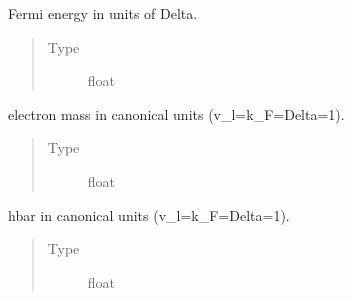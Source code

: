 \documentclass[letterpaper,10pt,english]{sphinxmanual}
\begin{document}
\begin{fulllineitems}
\begin{fulllineitems}
\end{fulllineitems}


\begin{fulllineitems}
\label{\detokenize{code_structure:scdc.material.Material.z}}
Fermi energy in units of Delta.
\begin{quote}\begin{description}
\item[{Type}] \leavevmode
float

\end{description}\end{quote}

\end{fulllineitems}


\begin{fulllineitems}
\label{\detokenize{code_structure:scdc.material.Material.m_e}}
electron mass in canonical units (v\_l=k\_F=Delta=1).
\begin{quote}\begin{description}
\item[{Type}] \leavevmode
float

\end{description}\end{quote}

\end{fulllineitems}


\begin{fulllineitems}
\label{\detokenize{code_structure:scdc.material.Material.hbar}}
hbar in canonical units (v\_l=k\_F=Delta=1).
\begin{quote}\begin{description}
\item[{Type}] \leavevmode
float

\end{description}\end{quote}

\end{fulllineitems}


\end{fulllineitems}
\end{document}
